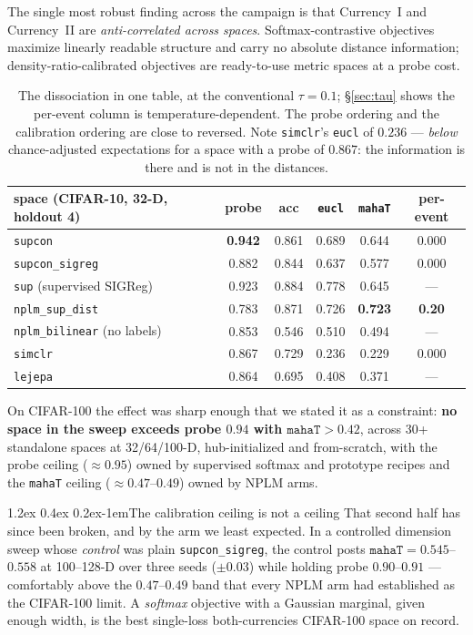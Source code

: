 \documentclass{article}
\makeatletter
\renewcommand\paragraph{\@startsection{paragraph}{4}{\z@}%
  {1.2ex \@plus 0.4ex \@minus 0.2ex}{-1em}{\normalsize\bf}}
\newcommand{\best}[1]{\textbf{#1}}
\makeatother
\begin{document}
The single most robust finding across the campaign is that Currency~I and
Currency~II are \emph{anti-correlated across spaces}. Softmax-contrastive
objectives maximize linearly readable structure and carry no absolute distance
information; density-ratio-calibrated objectives are ready-to-use metric spaces
at a probe cost.

\begin{table}[t]\centering\small
\begin{tabular}{lccccc}
\toprule
space (CIFAR-10, 32-D, holdout 4) & probe & acc & \texttt{eucl} & \texttt{mahaT} & per-event \\
\midrule
\texttt{supcon}                     & \best{0.942} & 0.861 & 0.689 & 0.644 & 0.000 \\
\texttt{supcon\_sigreg}             & 0.882 & 0.844 & 0.637 & 0.577 & 0.000 \\
\texttt{sup} (supervised SIGReg)    & 0.923 & 0.884 & 0.778 & 0.645 & --- \\
\texttt{nplm\_sup\_dist}            & 0.783 & 0.871 & 0.726 & \best{0.723} & \best{0.20} \\
\texttt{nplm\_bilinear} (no labels) & 0.853 & 0.546 & 0.510 & 0.494 & --- \\
\texttt{simclr}                     & 0.867 & 0.729 & 0.236 & 0.229 & 0.000 \\
\texttt{lejepa}                     & 0.864 & 0.695 & 0.408 & 0.371 & --- \\
\bottomrule
\end{tabular}
\caption{The dissociation in one table, at the conventional $\tau=0.1$;
\S\ref{sec:tau} shows the per-event column is temperature-dependent. The probe ordering and the
calibration ordering are close to reversed. Note \texttt{simclr}'s
\texttt{eucl} of $0.236$ --- \emph{below} chance-adjusted expectations for a
space with a probe of $0.867$: the information is there and is not in the
distances.}
\label{tab:dissoc}
\end{table}

On CIFAR-100 the effect was sharp enough that we stated it as a constraint:
\textbf{no space in the sweep exceeds probe $0.94$ with $\texttt{mahaT}>0.42$},
across 30+ standalone spaces at 32/64/100-D, hub-initialized and from-scratch,
with the probe ceiling ($\approx0.95$) owned by supervised softmax and prototype
recipes and the \texttt{mahaT} ceiling ($\approx0.47$--$0.49$) owned by NPLM
arms.

\paragraph{The calibration ceiling is not a ceiling}
That second half has since been broken, and by the arm we least expected. In a
controlled dimension sweep whose \emph{control} was plain
\texttt{supcon\_sigreg}, the control posts $\texttt{mahaT} = 0.545$--$0.558$ at
100--128-D over three seeds ($\pm0.03$) while holding probe $0.90$--$0.91$ ---
comfortably above the $0.47$--$0.49$ band that every NPLM arm had established as
the CIFAR-100 limit. A \emph{softmax} objective with a Gaussian marginal, given
enough width, is the best single-loss both-currencies CIFAR-100 space on record.
\end{document}
